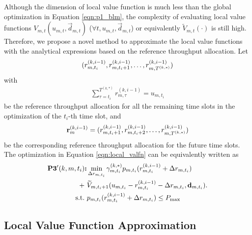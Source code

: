 Although the dimension of local value function is much less than the global optimization in Equation \eqref{eqn:p1_blm},
the complexity of evaluating local value functions $V_{m,t}  (u_{m,t}, \vec{d}_{m,t})$ ($\forall t, u_{m,t}, \vec{d}_{m,t}$) or equivalently $\widetilde{V}_{m,t}(\cdot)$ is still high. Therefore, we propose a novel method to approximate the local value functions with the analytical expressions based on the reference throughput allocation. 
Let
$$( r^{(k,i-1)}_{m,t_i}, r^{(k,i-1)}_{m,t_i+1}, \dots, r^{(k,i-1)}_{m,T^{(k,*)}} )$$
with 
\begin{align}
    \sum_{\tau=t_i}^{T^{(k,*)}} r^{(k,i-1)}_{m,\tau} = u_{m,t_i}
    \label{eqn:reference_constraint}
\end{align}
be the reference throughput allocation for all the remaining time slots in the optimization of the $t_i$-th time slot, and
\begin{align*}
    {\mathbf{r}}^{(k,i-1)}_{m} = ( r^{(k,i-1)}_{m,t_i+1}, r^{(k,i-1)}_{m,t_i+2}, \dots, r^{(k,i-1)}_{m,T^{(k,*)}} )
\end{align*}
be the corresponding reference throughput allocation for the future time slots. The optimization in Equation \eqref{eqn:local_valfn} can be equivalently written as
\begin{align}
\textbf{P3$'(k,m,t_i)$:}& \min_{ \Delta r_{m,t_i} } \gamma^{(k,*)}_{m,t_i} p_{m,t_i} (r^{(k,i-1)}_{m,t_i}+\Delta r_{m,t_i}) \nonumber\\ 
 +~&\widetilde{V}_{m,t_i+1}(u_{m,t_i}-r^{(k,i-1)}_{m,t_i}-\Delta r_{m,t_i}, \mathbf{d}_{m,t_i}).  \label{eqn:local_valfn_delta}
 \\
 \text{s.t.~}& p_{m,t_i}( r^{(k,i-1)}_{m,t_i} + \Delta{r}_{m,t_i} ) \leq P_{\max}
\end{align}

\subsection{Local Value Function Approximation}
\label{subsec:chapter2-local_valfn_approx}


